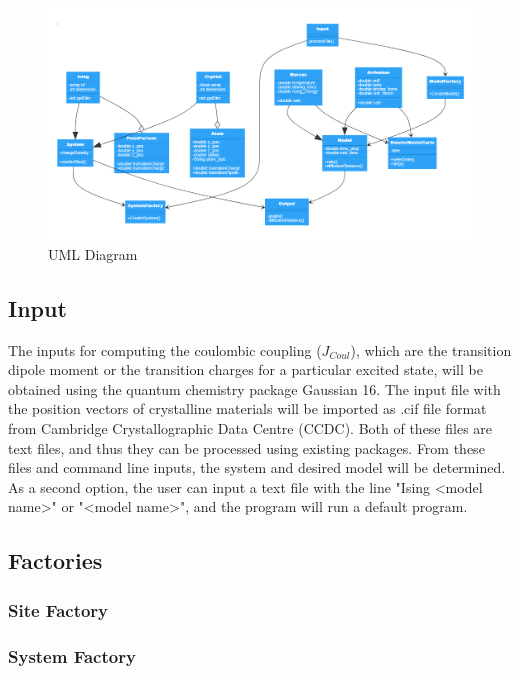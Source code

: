\documentclass{article}
\begin{document}
\begin{figure}
    \centering
   \includegraphics[scale=.2]{uml.png}
    \caption{UML Diagram}
    \label{fig:my_label}
\end{figure}



\subsection{Input}

The inputs for computing the coulombic coupling ($J_{Coul}$), which are the transition dipole moment or the transition charges for a particular excited state, will be obtained using the quantum chemistry package Gaussian 16. The input file with the position vectors of crystalline materials will be imported as .cif file format from Cambridge Crystallographic Data Centre (CCDC). Both of these files are text files, and thus they can be processed using existing packages. From these files and command line inputs, the system and desired model will be determined. As a second option, the user can input a text file with the line "Ising <model name>" or "<model name>", and the program will run a default program.


\subsection{Factories}

\subsubsection{Site Factory}

\subsubsection{System Factory}
\end{document}
